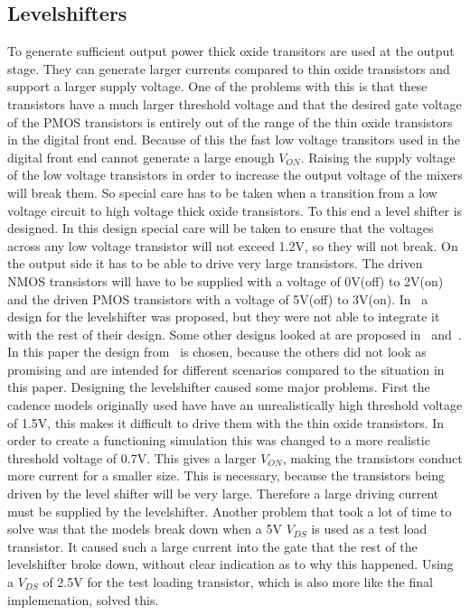 \makeatletter
\newcommand*{\textoverline}[1]{$\overline{\hbox{#1}}\m@th$}
\makeatother

\subsection{Levelshifters}\label{sec:levelshifter}
To generate sufficient output power thick oxide transitors are used at the output stage. They can generate larger currents compared to thin oxide transistors and support a larger supply voltage. One of the problems with this is that these transistors have a much larger threshold voltage and that the desired gate voltage of the PMOS transistors is entirely out of the range of the thin oxide transistors in the digital front end. Because of this the fast low voltage transitors used in the digital front end cannot generate a large enough $V_{ON}$. Raising the supply voltage of the low voltage transistors in order to increase the output voltage of the mixers will break them. So special care has to be taken when a transition from a low voltage circuit to high voltage thick oxide transistors. To this end a level shifter is designed. In this design special care will be taken to ensure that the voltages across any low voltage transistor will not exceed 1.2V, so they will not break. On the output side it has to be able to drive very large transistors. The driven NMOS transistors will have to be supplied with a voltage of 0V(off) to 2V(on) and the driven PMOS transistors with a voltage of 5V(off) to 3V(on). 
In~\cite{powerdac} a design for the levelshifter was proposed, but they were not able to integrate it with the rest of their design. Some other designs looked at are proposed in~\cite{koo2005new} and~\cite{hass2000level}. In this paper the design from~\cite{powerdac} is chosen, because the others did not look as promising and are intended for different scenarios compared to the situation in this paper. Designing the levelshifter caused some major problems. First the cadence models originally used have have an unrealistically high threshold voltage of 1.5V, this makes it difficult to drive them with the thin oxide transistors. In order to create a functioning simulation this was changed to a more realistic threshold voltage of 0.7V. This gives a larger $V_{ON}$, making the transistors conduct more current for a smaller size. This is necessary, because the transistors being driven by the level shifter will be very large. Therefore a large driving current must be supplied by the levelshifter. Another problem that took a lot of time to solve was that the models break down when a 5V $V_{DS}$ is used as  a test load transistor. It caused such a large current into the gate that the rest of the levelshifter broke down, without clear indication as to why this happened. Using a $V_{DS}$ of 2.5V for the test loading transistor, which is also more like the final implemenation, solved this. 
